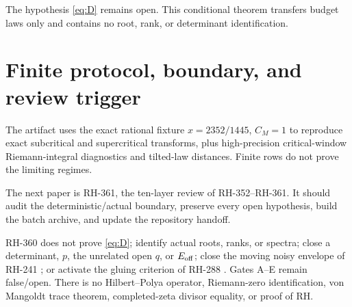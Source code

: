 \documentclass[11pt]{article}
\theoremstyle{remark}
\begin{document}
The hypothesis \eqref{eq:D} remains open.  This conditional theorem transfers
budget laws only and contains no root, rank, or determinant identification.

\section{Finite protocol, boundary, and review trigger}

The artifact uses the exact rational fixture $x=2352/1445$, $C_M=1$ to
reproduce exact subcritical and supercritical transforms, plus high-precision
critical-window Riemann-integral diagnostics and tilted-law distances.  Finite
rows do not prove the limiting regimes.

The next paper is RH-361, the ten-layer review of RH-352--RH-361.  It should
audit the deterministic/actual boundary, preserve every open hypothesis,
build the batch archive, and update the repository handoff.

RH-360 does not prove \eqref{eq:D}; identify actual roots, ranks, or spectra;
close a determinant, $p$, the unrelated open $q$, or $E_{\rm off}$; close the
moving noisy envelope of RH-241 \citep{WangEnvelopeReview2026}; or activate
the gluing criterion of RH-288 \citep{WangGluing2026}.  Gates A--E remain
false/open.  There is no Hilbert--Polya operator, Riemann-zero identification,
von Mangoldt trace theorem, completed-zeta divisor equality, or proof of RH.



\end{document}
